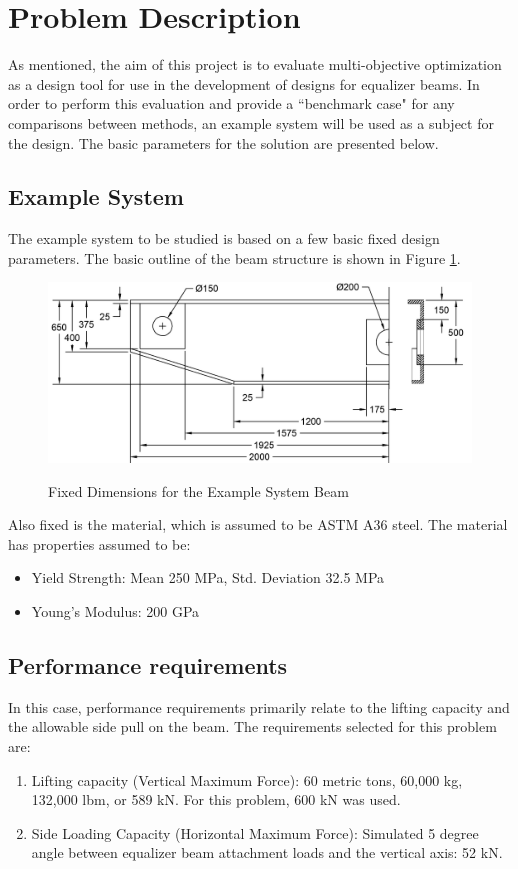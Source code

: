 \section{Problem Description}
As mentioned, the aim of this project is to evaluate multi-objective optimization as a design tool for use in the development of designs for equalizer beams. In order to perform this evaluation and provide a ``benchmark case" for any comparisons between methods, an example system will be used as a subject for the design. The basic parameters for the solution are presented below. 

\subsection{Example System}
\label{sec:beam_des}
The example system to be studied is based on a few basic fixed design parameters. The basic outline of the beam structure is shown in Figure \ref{img:dim_beam}. 

\begin{figure}
\includegraphics[width=\textwidth]{img/dim_beam.png}
	\label{img:dim_beam}
	\caption{Fixed Dimensions for the Example System Beam}
\end{figure}

Also fixed is the material, which is assumed to be ASTM A36 steel. The material has properties assumed to be: 

\begin{itemize}
\item Yield Strength: Mean 250 MPa, Std. Deviation 32.5 MPa
\item Young's Modulus: 200 GPa
\end{itemize}

\subsection{Performance requirements}
\label{sec:perf_req}
In this case, performance requirements primarily relate to the lifting capacity and the allowable side pull on the beam. The requirements selected for this problem are: 
\begin{enumerate}
	\item Lifting capacity (Vertical Maximum Force): 60 metric tons, 60,000 kg, 132,000 lbm, or 589 kN. For this problem, 600 kN was used. 
	\item Side Loading Capacity (Horizontal Maximum Force):  Simulated 5 degree angle between equalizer beam attachment loads and the vertical axis: 52 kN. 
\end{enumerate}

